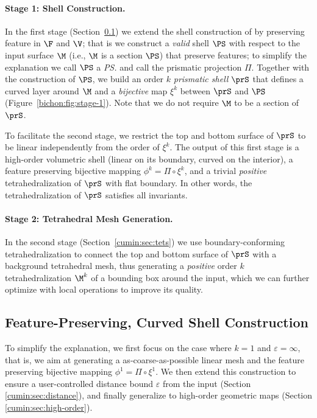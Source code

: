 \paragraph{Stage 1: Shell Construction.}
In the first stage (Section~\ref{cumin:sec:surface}) we extend the shell construction of \cite{jiang2020bijective} by preserving feature in $\F$ and $\V$; that is we construct a \emph{valid} shell $\PS$ with respect to the input surface $\M$ (i.e., $\M$ is a section $\PS$) that preserve features; to simplify the explanation we call $\PS$ a \emph{\ps{}} and call the prismatic projection $\Pi$. Together with the construction of $\PS$, we build an order $k$ \emph{prismatic shell} $\prS$ that defines a curved layer around $\M$ and a \emph{bijective} map $\xi^k$ between $\prS$ and $\PS$ (Figure~\ref{bichon:fig:stage-1}). Note that we do not require $\M$ to be a section of $\prS$.

To facilitate the second stage, we restrict the top and bottom surface of $\prS$ to be linear independently from the order of $\xi^k$. The output of this first stage is a high-order volumetric shell (linear on its boundary, curved on the interior), a feature preserving bijective mapping $\phi^k = \Pi \circ \xi^k$, and a trivial \emph{positive} tetrahedralization of $\prS$ with flat boundary. In other words, the tetrahedralization of $\prS$ satisfies all invariants.

\paragraph{Stage 2: Tetrahedral Mesh Generation.}
In the second stage (Section~\ref{cumin:sec:tets}) we use boundary-conforming tetrahedralization to connect the top and bottom surface of $\prS$ with a background tetrahedral mesh, thus generating a \emph{positive} order $k$ tetrahedralization $\M^k$ of a bounding box around the input, which we can further optimize with local operations to improve its quality. %



\subsection{Feature-Preserving, Curved Shell Construction}\label{cumin:sec:surface}
To simplify the explanation, we first focus on the case where $k=1$ and $\varepsilon = \infty$, that is, we aim at generating a as-coarse-as-possible linear mesh and the feature preserving bijective mapping $\phi^1 = \Pi \circ \xi^1$. We then extend this construction to ensure a user-controlled distance bound $\varepsilon$ from the input (Section \ref{cumin:sec:distance}), and finally generalize to high-order geometric maps (Section \ref{cumin:sec:high-order}).

